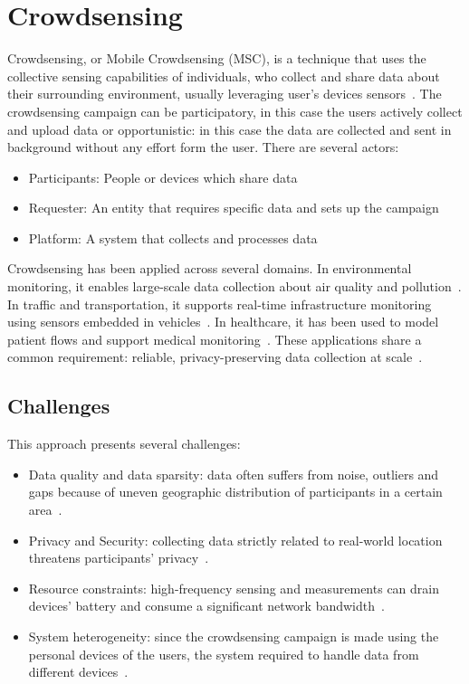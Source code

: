 \section{Crowdsensing}\label{sec:crowdsensing}
Crowdsensing, or Mobile Crowdsensing (MSC), is a technique that uses the collective sensing capabilities of individuals, who collect and share data about their surrounding environment, usually leveraging user's devices sensors~\cite{ganti2011mobile}.
The crowdsensing campaign can be participatory, in this case the users actively collect and upload data or opportunistic: in this case the data are collected and sent in background without any effort form the user.
There are several actors:
\begin{itemize}
    \item Participants: People or devices which share data
    \item Requester: An entity that requires specific data and sets up the campaign
    \item Platform: A system that collects and processes data
\end{itemize}
Crowdsensing has been applied across several domains.
In environmental monitoring, it enables large-scale data
collection about air quality and pollution~\cite{kang2017crowdsensing}.
In traffic and transportation, it supports real-time infrastructure monitoring using sensors embedded in vehicles~\cite{mei2020crowdsensing}.
In healthcare, it has been used to model patient flows and support medical monitoring~\cite{lane2010survey}.
These applications share a common requirement: reliable, privacy-preserving data collection at scale~\cite{ganti2011mobile}.

\subsection{Challenges}
This approach presents several challenges:
\begin{itemize}
    \item Data quality and data sparsity: data often suffers from noise, outliers and gaps because of uneven geographic distribution of participants in a certain area~\cite{ganti2011mobile, lane2010survey}.
    \item Privacy and Security: collecting data strictly related to real-world location threatens participants' privacy~\cite{ganti2011mobile}.
    \item Resource constraints: high-frequency sensing and measurements can drain devices' battery and consume a significant network bandwidth~\cite{lane2010survey}.
    \item System heterogeneity: since the crowdsensing campaign is made using the personal devices of the users, the system required to handle data from different devices~\cite{lane2010survey}.
\end{itemize}

